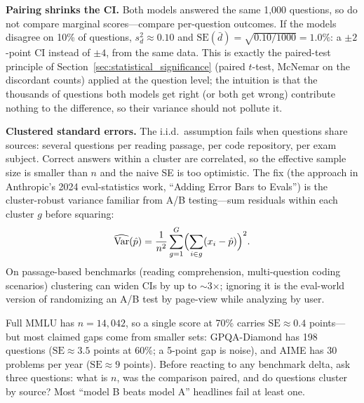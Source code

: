 \textbf{Pairing shrinks the CI.} Both models answered the same 1{,}000 questions, so do not compare marginal scores---compare per-question outcomes. If the models disagree on 10\% of questions, $s_d^2 \approx 0.10$ and $\text{SE}(\bar{d}) = \sqrt{0.10/1000} = 1.0\%$: a $\pm 2$-point CI instead of $\pm 4$, from the same data. This is exactly the paired-test principle of Section~\ref{sec:statistical_significance} (paired $t$-test, McNemar on the discordant counts) applied at the question level; the intuition is that the thousands of questions both models get right (or both get wrong) contribute nothing to the difference, so their variance should not pollute it.

\textbf{Clustered standard errors.} The i.i.d.\ assumption fails when questions share sources: several questions per reading passage, per code repository, per exam subject. Correct answers within a cluster are correlated, so the effective sample size is smaller than $n$ and the naive SE is too optimistic. The fix (the approach in Anthropic's 2024 eval-statistics work, ``Adding Error Bars to Evals'') is the cluster-robust variance familiar from A/B testing---sum residuals within each cluster $g$ before squaring:
\[
\widehat{\operatorname{Var}}(\hat{p}) = \frac{1}{n^2} \sum_{g=1}^{G} \Bigl( \sum_{i \in g} (x_i - \hat{p}) \Bigr)^{2}.
\]
On passage-based benchmarks (reading comprehension, multi-question coding scenarios) clustering can widen CIs by up to $\sim$3$\times$; ignoring it is the eval-world version of randomizing an A/B test by page-view while analyzing by user.

\begin{keyinsight}
Full MMLU has $n = 14{,}042$, so a single score at 70\% carries $\text{SE} \approx 0.4$ points---but most claimed gaps come from smaller sets: GPQA-Diamond has 198 questions ($\text{SE} \approx 3.5$ points at 60\%; a 5-point gap is noise), and AIME has 30 problems per year ($\text{SE} \approx 9$ points). Before reacting to any benchmark delta, ask three questions: what is $n$, was the comparison paired, and do questions cluster by source? Most ``model B beats model A'' headlines fail at least one.
\end{keyinsight}

